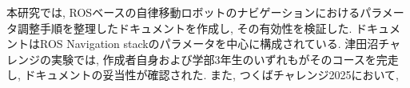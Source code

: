本研究では, ROSベースの自律移動ロボットのナビゲーションにおけるパラメータ調整手順を整理したドキュメントを作成し, その有効性を検証した. 
ドキュメントはROS Navigation stackのパラメータを中心に構成されている. 
津田沼チャレンジの実験では, 作成者自身および学部3年生のいずれもがそのコースを完走し, ドキュメントの妥当性が確認された. 
また, つくばチャレンジ2025において, 